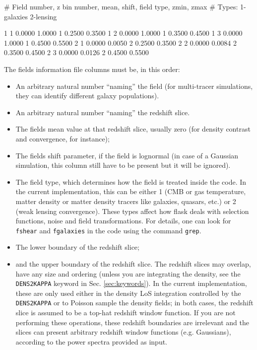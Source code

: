 \documentclass[12pt]{book} %
\newenvironment{alltt}{\ttfamily}{\par}
\begin{document}
\begin{alltt}
\begin{center}
\begin{boxedverbatim}
# Field number, z bin number, mean, shift, field type, zmin, zmax
# Types: 1-galaxies 2-lensing

     1      1   0.0000   1.0000      1   0.2500   0.3500
     1      2   0.0000   1.0000      1   0.3500   0.4500
     1      3   0.0000   1.0000      1   0.4500   0.5500
     2      1   0.0000   0.0050      2   0.2500   0.3500
     2      2   0.0000   0.0084      2   0.3500   0.4500
     2      3   0.0000   0.0126      2   0.4500   0.5500
\end{boxedverbatim}
\end{center}
\end{alltt}

The fields information file columns must be, in this order:
\begin{itemize}
\item An arbitrary natural number ``naming'' the field (for multi-tracer simulations, they can identify 
  different galaxy populations).
\item An arbitrary natural number ``naming'' the redshift slice.
\item The fields mean value at that redshift slice, usually zero (for density contrast and convergence, for instance);
\item The fields shift parameter, if the field is lognormal (in case of a Gaussian simulation, this column 
  still have to be present but it will be ignored).
\item The field type, which determines how the field is treated inside the code. In the current 
  implementation, this can be either 1 (CMB or gas temperature, matter density or matter density tracers like 
  galaxies, quasars, etc.) or 2 (weak lensing convergence). These types affect how {\sc flask} deals with 
  selection functions, noise and field transformations. For details, one can look for {\tt fshear} and 
  {\tt fgalaxies} in the code using the command {\tt grep}.
\item The lower boundary of the redshift slice;
\item and the upper boundary of the redshift slice. The redshift slices may overlap, have any size and ordering 
  (unless you are integrating the density, see the {\tt DENS2KAPPA} keyword in Sec. \ref{sec:keywords}). 
  In the current implementation, these are only used either in the density LoS integration controlled by the {\tt DENS2KAPPA} 
  or to Poisson sample the density fields; in both cases, the redshift slice is assumed to be a top-hat 
  redshift window function. If you are not performing these operations, these redshift boundaries are 
  irrelevant and the slices can present arbitrary redshift window functions (e.g. Gaussians), according to 
  the power spectra provided as input.
\end{itemize}
\end{document}

